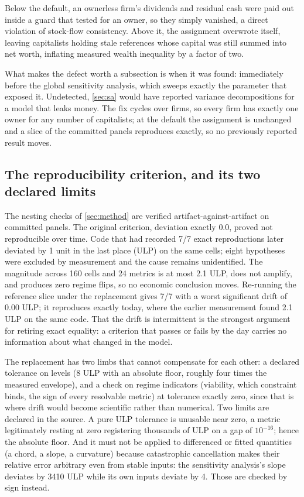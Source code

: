 Below the default, an ownerless firm's dividends and residual cash were paid
out inside a guard that tested for an owner, so they simply vanished, a
direct violation of stock-flow consistency. Above it, the assignment overwrote
itself, leaving capitalists holding stale references whose capital was still
summed into net worth, inflating measured wealth inequality by a factor of two.

What makes the defect worth a subsection is when it was found:
immediately before the global sensitivity analysis, which sweeps exactly the
parameter that exposed it. Undetected, \cref{sec:sa} would have reported
variance decompositions for a model that leaks money. The fix cycles over
firms, so every firm has exactly one owner for any number of
capitalists; at the default the assignment is unchanged and a slice of the
committed panels reproduces exactly, so no previously reported result moves.

\subsection{The reproducibility criterion, and its two declared limits}
\label{app:bytecheck}

The nesting checks of \cref{sec:method} are verified
artifact-against-artifact on committed panels. The original criterion, deviation exactly $0.0$, proved not
reproducible over time. Code that had recorded 7/7 exact reproductions later
deviated by 1 unit in the last place (ULP) on the same cells; eight hypotheses
were excluded by measurement and the cause remains unidentified. The magnitude
across 160 cells and 24 metrics is at most 2.1 ULP, does not amplify, and
produces zero regime flips, so no economic conclusion moves. Re-running
the reference slice under the replacement gives 7/7 with a worst significant
drift of $0.00$ ULP; it reproduces exactly today, where the earlier
measurement found 2.1 ULP on the same code. That the drift is intermittent is
the strongest argument for retiring exact equality: a criterion that passes or
fails by the day carries no information about what changed in the model.

The replacement has two limbs that cannot compensate for each other: a declared
tolerance on levels (8 ULP with an absolute floor, roughly four times
the measured envelope), and a check on regime indicators (viability,
which constraint binds, the sign of every resolvable metric) at tolerance
exactly zero, since that is where drift would become scientific rather than
numerical. Two limits are declared in the source. A pure ULP tolerance is
unusable near zero, a metric legitimately resting at zero registering thousands
of ULP on a gap of $10^{-16}$; hence the absolute floor. And it must not be
applied to differenced or fitted quantities (a chord, a slope, a curvature)
because catastrophic cancellation makes their relative error arbitrary even
from stable inputs: the sensitivity analysis's slope deviates by 3410 ULP while
its own inputs deviate by 4. Those are checked by sign instead.

